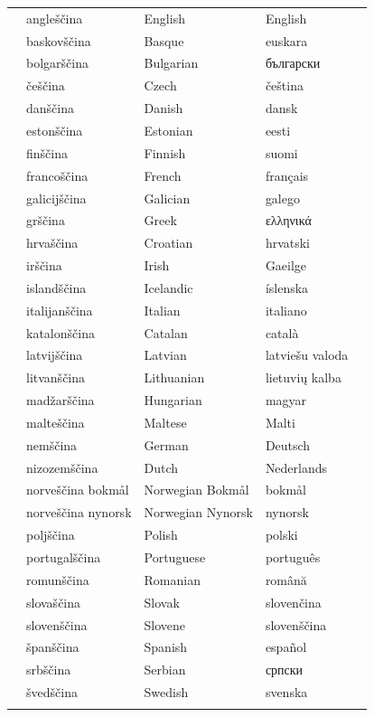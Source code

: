 \vspace*{-5mm}
\centering
  \setlength{\tabcolsep}{2em}
  \begin{tabularx}{\textwidth}{lllll} \toprule\addlinespace
  &angleščina & English & English& \\
  &baskovščina & Basque & euskara& \\
  &bolgarščina & Bulgarian & български& \\
  &češčina & Czech & čeština& \\
  &danščina & Danish & dansk& \\
  &estonščina & Estonian & eesti& \\
  &finščina & Finnish & suomi& \\
  &francoščina & French & français& \\
  &galicijščina & Galician & galego& \\
  &grščina & Greek & ελληνικά& \\
  &hrvaščina & Croatian & hrvatski& \\
  &irščina & Irish & Gaeilge& \\
  &islandščina & Icelandic & íslenska& \\
  &italijanščina & Italian & italiano& \\
  &katalonščina & Catalan & català& \\
  &latvijščina & Latvian & latviešu valoda& \\
  &litvanščina & Lithuanian & lietuvių kalba& \\
  &madžarščina & Hungarian & magyar& \\
  &malteščina & Maltese & Malti& \\
  &nemščina & German & Deutsch& \\
  &nizozemščina & Dutch & Nederlands& \\
  &norveščina bokmål & Norwegian Bokmål & bokmål& \\
  &norveščina nynorsk & Norwegian Nynorsk & nynorsk& \\
  &poljščina & Polish & polski& \\
  &portugalščina & Portuguese & português& \\
  &romunščina & Romanian & română& \\
  &slovaščina & Slovak & slovenčina& \\
  &slovenščina & Slovene & slovenščina& \\
  &španščina & Spanish & español& \\
  &srbščina & Serbian & српски& \\
  &švedščina & Swedish & svenska& \\ \addlinespace \bottomrule
\end{tabularx}
